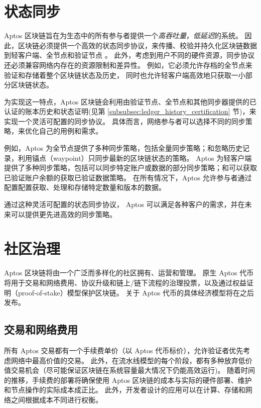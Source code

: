 \documentclass{article}
\begin{document}
\section{状态同步}
\label{sub:state_sync}

Aptos 区块链旨在为生态中的所有参与者提供一个\emph{高吞吐量}，\emph{低延迟}的系统。 因此，区块链必须提供一个高效的状态同步协议，来传播、校验并持久化区块链数据到轻客户端、全节点和验证节点 \cite{evolution_state_sync}。 此外，考虑到用户不同的硬件资源，同步协议还必须兼容网络内存在的资源限制和差异性。 例如，它必须允许存档的全节点来验证和存储着整个区块链状态及历史， 同时也允许轻客户端高效地只获取一小部分区块链状态。

为实现这一特点，Aptos 区块链会利用由验证节点、全节点和其他同步器提供的已认证的账本历史和状态证明(见第 \ref{subsubsec:ledger_history_certification} 节)，来实现一个灵活可配置的同步协议。 具体而言，网络参与者可以选择不同的同步策略，来优化自己的用例和需求。

例如，Aptos 为全节点提供了多种同步策略，包括全量同步策略；和忽略历史记录，利用锚点（waypoint）只同步最新的区块链状态的策略。 Aptos 为轻客户端提供了多种同步策略，包括可以同步特定账户或数据的部分同步策略；和可以获取已验证账户余额的获取已验证数据策略。 在所有情况下，Aptos 允许参与者通过配置配置获取、处理和存储特定数量和版本的数据。

通过这种灵活可配置的状态同步协议， Aptos 可以满足各种客户的需求，并在未来可以提供更先进高效的同步策略。

\section{社区治理}
\label{sec:community_ownership}

Aptos 区块链将由一个广泛而多样化的社区拥有、运营和管理。 原生 Aptos 代币将用于交易和网络费用、协议升级和链上/链下流程的治理投票，以及通过权益证明（proof-of-stake）模型保护区块链。 关于 Aptos 代币的具体经济模型将在之后发布。

\subsection{交易和网络费用}
\label{subsec:network_fees}

所有 Aptos 交易都有一个手续费单价（以 Aptos 代币标价），允许验证者优先考虑网络中最高价值的交易。 此外，在流水线模型的每个阶段，都有多种放弃低价值交易机会（尽可能保证区块链在系统容量最大情况下仍能高效运行)。 随着时间的推移，手续费的部署将确保使用 Aptos 区块链的成本与实际的硬件部署、维护和节点操作的实际成本成正比。 此外，开发者设计的应用可以在计算、存储和网络之间根据成本不同进行权衡。
\end{document}
